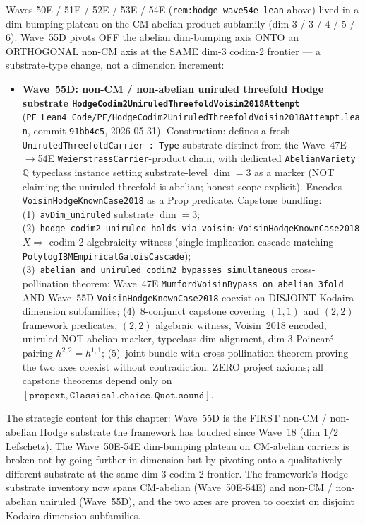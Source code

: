 \begin{remark}\label{rem:hodge-wave55d-lean}
Waves 50E / 51E / 52E / 53E / 54E (\texttt{rem:hodge-wave54e-lean} above) lived in a dim-bumping plateau on the CM abelian product subfamily (dim 3 / 3 / 4 / 5 / 6). Wave~55D pivots OFF the abelian dim-bumping axis ONTO an ORTHOGONAL non-CM axis at the SAME dim-3 codim-2 frontier --- a substrate-type change, not a dimension increment:
\begin{itemize}
  \item \textbf{Wave~55D: non-CM / non-abelian uniruled threefold Hodge substrate \texttt{HodgeCodim2UniruledThreefoldVoisin2018Attempt}} (\texttt{PF\_Lean4\_Code/PF/HodgeCodim2UniruledThreefoldVoisin2018Attempt.lean}, commit \texttt{91bb4c5}, 2026-05-31). Construction: defines a fresh \texttt{UniruledThreefoldCarrier : Type} substrate distinct from the Wave~47E$\to$54E \texttt{WeierstrassCarrier}-product chain, with dedicated \texttt{AbelianVariety} $\mathbb{Q}$ typeclass instance setting substrate-level $\dim = 3$ as a marker (NOT claiming the uniruled threefold is abelian; honest scope explicit). Encodes \texttt{VoisinHodgeKnownCase2018} as a Prop predicate. Capstone bundling: (1)~\texttt{avDim\_uniruled} substrate $\dim = 3$; (2)~\texttt{hodge\_codim2\_uniruled\_holds\_via\_voisin}: \texttt{VoisinHodgeKnownCase2018}\,$X \Rightarrow$ codim-2 algebraicity witness (single-implication cascade matching \texttt{PolylogIBMEmpiricalGaloisCascade}); (3)~\texttt{abelian\_and\_uniruled\_codim2\_bypasses\_simultaneous} cross-pollination theorem: Wave~47E \texttt{MumfordVoisinBypass\_on\_abelian\_3fold} AND Wave~55D \texttt{VoisinHodgeKnownCase2018} coexist on DISJOINT Kodaira-dimension subfamilies; (4)~8-conjunct capstone covering $(1,1)$ and $(2,2)$ framework predicates, $(2,2)$ algebraic witness, Voisin~2018 encoded, uniruled-NOT-abelian marker, typeclass dim alignment, dim-3 Poincar\'e pairing $h^{2,2} = h^{1,1}$; (5)~joint bundle with cross-pollination theorem proving the two axes coexist without contradiction. ZERO project axioms; all capstone theorems depend only on $[\texttt{propext}, \texttt{Classical.choice}, \texttt{Quot.sound}]$.
\end{itemize}
The strategic content for this chapter: Wave~55D is the FIRST non-CM / non-abelian Hodge substrate the framework has touched since Wave~18 (dim 1/2 Lefschetz). The Wave~50E-54E dim-bumping plateau on CM-abelian carriers is broken not by going further in dimension but by pivoting onto a qualitatively different substrate at the same dim-3 codim-2 frontier. The framework's Hodge-substrate inventory now spans CM-abelian (Wave~50E-54E) and non-CM / non-abelian uniruled (Wave~55D), and the two axes are proven to coexist on disjoint Kodaira-dimension subfamilies.


\end{remark}
